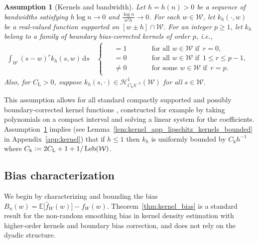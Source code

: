 \documentclass[11pt,lof]{puthesis}
\newcommand{\E}{\ensuremath{\mathbb{E}}}
\newcommand{\rL}{\ensuremath{\mathrm{L}}}
\newcommand{\rk}{\ensuremath{\mathrm{k}}}
\newcommand{\cH}{\ensuremath{\mathcal{H}}}
\newcommand{\cW}{\ensuremath{\mathcal{W}}}
\DeclareMathOperator{\Leb}{Leb}
\newcommand{\diff}[1]{\,\mathrm{d}#1}
\theoremstyle{break}
\newtheorem{assumption}{Assumption}[section]
\theoremstyle{proof}
\begin{document}
\begin{assumption}[Kernels and bandwidth]
\label{ass:kernel_bandwidth}%
%
Let $h = h(n) > 0$ be a sequence of bandwidths satisfying $h \log n \to 0$
and $\frac{\log n}{n^2h} \to 0$. For each $w \in \cW$, let $k_h(\cdot, w)$ be
a real-valued function supported on $[w \pm h] \cap \cW$. For an integer
$p \geq 1$, let $k_h$ belong to a family of boundary bias-corrected kernels
of order $p$, i.e.,
%
\begin{align*}
\int_{\cW}
(s-w)^r k_h(s,w) \diff{s}
\quad
\begin{cases}
\begin{alignedat}{2}
&= 1 &\qquad &\text{for all } w \in \cW \text{ if }\, r = 0, \\
&= 0 & &\text{for all } w \in \cW \text{ if }\, 1 \leq r \leq p-1, \\
&\neq 0 & &\text{for some } w \in \cW \text{ if }\, r = p.
\end{alignedat}
\end{cases}
\end{align*}
%
Also, for $C_\rL > 0$,
suppose $k_h(s, \cdot) \in \cH^1_{C_\rL h^{-2}}(\cW)$
for all $s \in \cW$.
%
\end{assumption}

This assumption allows for all standard compactly supported and possibly
boundary-corrected kernel functions
\citep{wand1994kernel,simonoff1996smoothing}, constructed for example by taking
polynomials on a compact interval and solving a linear system for the
coefficients. Assumption~\ref{ass:kernel_bandwidth} implies
(see Lemma~\ref{lem:kernel_app_lipschitz_kernels_bounded}
in Appendix~\ref{app:kernel})
that if $h \leq 1$ then $k_h$ is uniformly bounded by
$C_\rk h^{-1}$ where $C_\rk \vcentcolon = 2 C_\rL + 1 + 1/\Leb(\cW)$.

\subsection{Bias characterization}
\label{sec:kernel_bias}

We begin by characterizing and bounding the bias
$B_n(w) = \E \big[ \hat f_W(w) \big] - f_W(w)$.
Theorem~\ref{thm:kernel_bias} is a standard result for the non-random smoothing
bias in kernel density estimation with higher-order kernels and boundary bias
correction, and does not rely on the dyadic structure.
\end{document}
